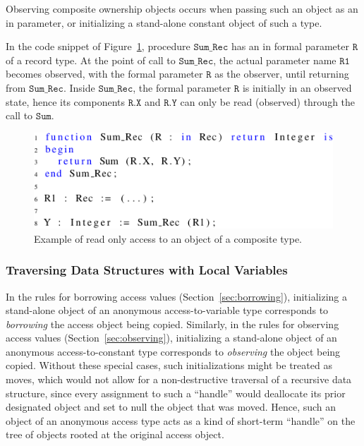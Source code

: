 \documentclass[runningheads]{llncs}
\newcommand\var[1]{\ensuremath{\mathtt{#1}}}
\newcommand{\keyword}[1]{\textsf{#1}}
\begin{document}
Observing composite ownership objects occurs when passing such an object as an \keyword{in} parameter, or initializing a stand-alone constant object of such a type.

In the code snippet of Figure~\ref{fig:observingComposite}, procedure \var{Sum\_Rec} has an \keyword{in} formal parameter \var{R} of a record type.
At the point of call to \var{Sum\_Rec}, the actual parameter name \var{R1} becomes observed, with the formal parameter \var{R} as the observer, until returning from \var{Sum\_Rec}. Inside \var{Sum\_Rec},
the formal parameter \var{R} is initially in an observed state, hence its components \var{R.X} and \var{R.Y} can only be read (observed) through the call to \var{Sum}.


\begin{figure}[htb!]
\centering
  \captionsetup{justification=centering,margin=0.6cm}
   \includegraphics[]{observingComposite}
   \caption{Example of read only access to an object of a composite type.}
   \label{fig:observingComposite}
\end{figure}


\subsubsection{Traversing Data Structures with Local Variables}

In the rules for borrowing access values (Section~\ref{sec:borrowing}), initializing a stand-alone object of an anonymous access-to-variable type corresponds to
\textit{borrowing} the access object being copied. Similarly, in the rules for observing access values (Section~\ref{sec:observing}), initializing a stand-alone object of an
anonymous access-to-constant type corresponds to \textit{observing} the object being copied. Without these special cases, such initializations might be treated as moves, which would not allow for a non-destructive
traversal of a recursive data structure, since every assignment to such a ``handle'' would
deallocate its prior designated object and set to null the object that was moved.  Hence, such an object of an anonymous access type acts as a kind of short-term ``handle'' on the tree of objects rooted at the original access object.
\end{document}
